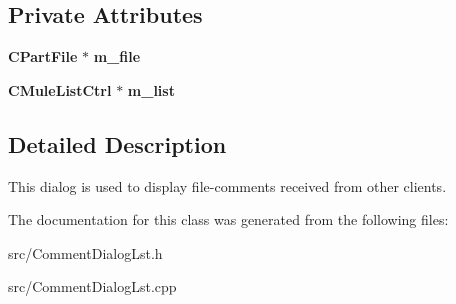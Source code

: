 \subsection*{Private Attributes}
\begin{DoxyCompactItemize}
\item 
{\bf CPartFile} $\ast$ {\bf m\_\-file}\label{classCCommentDialogLst_a9b18a4ce4548369f89cfd7debb7e103c}

\item 
{\bf CMuleListCtrl} $\ast$ {\bf m\_\-list}\label{classCCommentDialogLst_a5256bd05b2ba658969dabfbc57fe9657}

\end{DoxyCompactItemize}


\subsection{Detailed Description}
This dialog is used to display file-\/comments received from other clients. 

The documentation for this class was generated from the following files:\begin{DoxyCompactItemize}
\item 
src/CommentDialogLst.h\item 
src/CommentDialogLst.cpp\end{DoxyCompactItemize}

